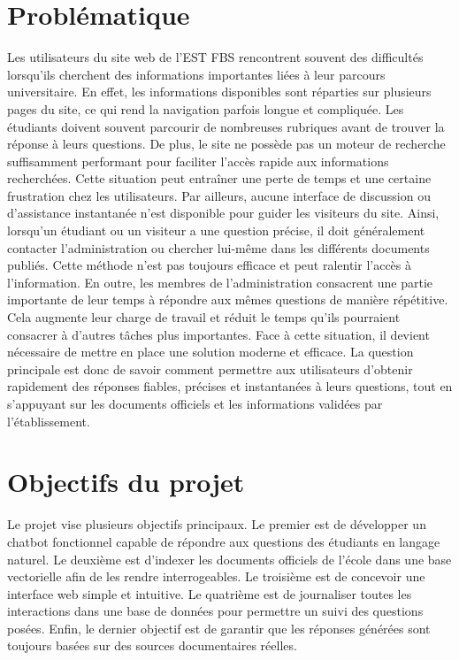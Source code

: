 \documentclass[12pt,a4paper]{report}
\begin{document}
\section{Problématique}
Les utilisateurs du site web de l’EST FBS rencontrent souvent des difficultés lorsqu’ils cherchent des informations importantes liées à leur parcours universitaire. En effet, les informations disponibles sont réparties sur plusieurs pages du site, ce qui rend la \newline navigation parfois longue et compliquée. Les étudiants doivent souvent parcourir de \newline nombreuses rubriques avant de trouver la réponse à leurs questions. De plus, le site ne possède pas un moteur de recherche suffisamment performant pour faciliter l’accès rapide aux informations recherchées. Cette situation peut entraîner une perte de temps et une certaine frustration chez les utilisateurs. Par ailleurs, aucune interface de discussion ou d’assistance instantanée n’est disponible pour guider les visiteurs du site. Ainsi, lorsqu’un étudiant ou un visiteur a une question précise, il doit généralement contacter \newline l’administration ou chercher lui-même dans les différents documents publiés. Cette \newline méthode n’est pas toujours efficace et peut ralentir l’accès à l’information. En outre, les membres de l’administration consacrent une partie importante de leur temps à répondre aux mêmes questions de manière répétitive. Cela augmente leur charge de travail et réduit le temps qu’ils pourraient consacrer à d’autres tâches plus importantes. Face à cette \newline situation, il devient nécessaire de mettre en place une solution moderne et efficace. La question principale est donc de savoir comment permettre aux utilisateurs d’obtenir \newline rapidement des réponses fiables, précises et instantanées à leurs questions, tout en \newline s’appuyant sur les documents officiels et les informations validées par l’établissement.

\section{Objectifs du projet}
Le projet vise plusieurs objectifs principaux. Le premier est de développer un \newline chatbot fonctionnel capable de répondre aux questions des étudiants en langage naturel. Le deuxième est d'indexer les documents officiels de l'école dans une base vectorielle afin de les rendre interrogeables. Le troisième est de concevoir une interface web simple et intuitive. Le quatrième est de journaliser toutes les interactions dans une base de données pour permettre un suivi des questions posées. Enfin, le dernier objectif est de garantir que les réponses générées sont toujours basées sur des sources documentaires réelles.
\newpage
\end{document}
